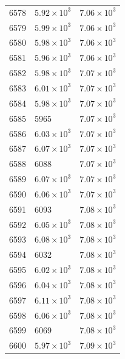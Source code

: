 \begin{table}[H]
\begin{tabular}{lll}
6578 & $\displaystyle 5.92 \times 10^{3}$ & $\displaystyle 7.06 \times 10^{3}$ \\
6579 & $\displaystyle 5.99 \times 10^{3}$ & $\displaystyle 7.06 \times 10^{3}$ \\
6580 & $\displaystyle 5.98 \times 10^{3}$ & $\displaystyle 7.06 \times 10^{3}$ \\
6581 & $\displaystyle 5.96 \times 10^{3}$ & $\displaystyle 7.06 \times 10^{3}$ \\
6582 & $\displaystyle 5.98 \times 10^{3}$ & $\displaystyle 7.07 \times 10^{3}$ \\
6583 & $\displaystyle 6.01 \times 10^{3}$ & $\displaystyle 7.07 \times 10^{3}$ \\
6584 & $\displaystyle 5.98 \times 10^{3}$ & $\displaystyle 7.07 \times 10^{3}$ \\
6585 & 5965 & $\displaystyle 7.07 \times 10^{3}$ \\
6586 & $\displaystyle 6.03 \times 10^{3}$ & $\displaystyle 7.07 \times 10^{3}$ \\
6587 & $\displaystyle 6.07 \times 10^{3}$ & $\displaystyle 7.07 \times 10^{3}$ \\
6588 & 6088 & $\displaystyle 7.07 \times 10^{3}$ \\
6589 & $\displaystyle 6.07 \times 10^{3}$ & $\displaystyle 7.07 \times 10^{3}$ \\
6590 & $\displaystyle 6.06 \times 10^{3}$ & $\displaystyle 7.07 \times 10^{3}$ \\
6591 & 6093 & $\displaystyle 7.08 \times 10^{3}$ \\
6592 & $\displaystyle 6.05 \times 10^{3}$ & $\displaystyle 7.08 \times 10^{3}$ \\
6593 & $\displaystyle 6.08 \times 10^{3}$ & $\displaystyle 7.08 \times 10^{3}$ \\
6594 & 6032 & $\displaystyle 7.08 \times 10^{3}$ \\
6595 & $\displaystyle 6.02 \times 10^{3}$ & $\displaystyle 7.08 \times 10^{3}$ \\
6596 & $\displaystyle 6.04 \times 10^{3}$ & $\displaystyle 7.08 \times 10^{3}$ \\
6597 & $\displaystyle 6.11 \times 10^{3}$ & $\displaystyle 7.08 \times 10^{3}$ \\
6598 & $\displaystyle 6.06 \times 10^{3}$ & $\displaystyle 7.08 \times 10^{3}$ \\
6599 & 6069 & $\displaystyle 7.08 \times 10^{3}$ \\
6600 & $\displaystyle 5.97 \times 10^{3}$ & $\displaystyle 7.09 \times 10^{3}$ \\

\end{tabular}
\end{table}
